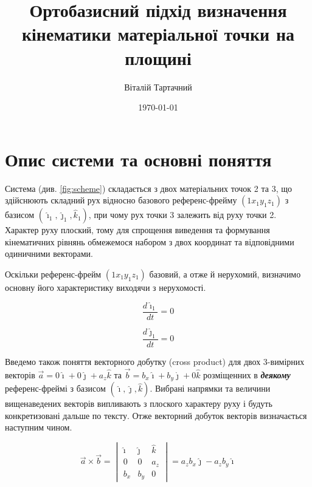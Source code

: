 \documentclass[12pt]{article}
\title{Ортобазисний підхід визначення кінематики матеріальної точки на площині}
\date{\today}
\author{Віталій Тартачний}
\begin{document}
 	\maketitle
 	\section*{Опис системи та основні поняття}
 	Система (див. \ref{fig:scheme}) складається з двох матеріальних точок 2 та 3, що здійснюють складний рух відносно базового референс-фрейму $(1x_1y_1z_1)$ з базисом $(\hat{\imath}_{1}, \hat{\jmath}_{1}, \hat{k}_{1})$, при чому рух точки 3 залежить від руху точки 2. Характер руху плоский, тому для спрощення виведення та формування кінематичних рівнянь обмежемося набором з двох координат та відповідними одиничними векторами.
 	
 	Оскільки референс-фрейм $(1x_1y_1z_1)$ базовий, а отже й нерухомий, визначимо основну його характеристику виходячи з нерухомості.
 	
 	\begin{equation}
 	\label {eq:di0}
 	\frac{d\hat{\imath}_{1}} {dt}=0 
 	\end{equation}
 	
 	\begin{equation}
 	\label {eq:dj0}
 	\frac{d\hat{\jmath}_{1}} {dt}=0 
 	\end{equation}
 	 
 	 Введемо також поняття векторного добутку (cross product) для двох 3-вимірних векторів $\vec{a}=0 \hat{\imath}+0 \hat{\jmath} + a_z \hat{k}$  та $\vec{b}=b_x \hat{\imath}+b_y \hat{\jmath} + 0 \hat{k}$ розміщенних в \textbf{\textit{деякому}} референс-фреймі з базисом $(\hat{\imath}, \hat{\jmath}, \hat{k})$. Вибрані напрямки та величини вищенаведених векторів випливають з плоского характеру руху і будуть конкретизовані дальше по тексту. Отже векторний добуток векторів визначається наступним чином.
 	 
 	 \begin{equation}
 	 \label {eq:crossprod}
 	 \vec{a} \times \vec{b} = 
 	 \begin {vmatrix}
 	 \hat{\imath} & \hat{\jmath} & \hat{k} \\
 	 0 & 0 & a_z \\
 	 b_x & b_y & 0
 	 \end{vmatrix}
 	 = a_z b_x \hat{\jmath} - a_z b_y \hat{\imath}
 	 \end{equation}
 	 
\end{document}

